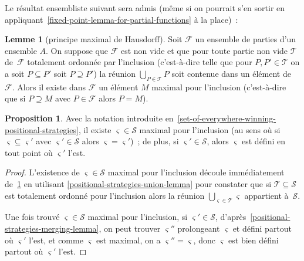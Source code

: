 \documentclass[12pt,a4paper]{article}
\theoremstyle{definition}
\newtheorem{prop}[comcnt]{Proposition}
\newtheorem{lem}[comcnt]{Lemme}
\begin{document}
Le résultat ensembliste suivant sera admis (même si on pourrait s'en
sortir en appliquant \ref{fixed-point-lemma-for-partial-functions} à
la place) :
\begin{lem}[principe maximal de Hausdorff]\label{hausdorff-maximal-principle}
Soit $\mathscr{F}$ un ensemble de parties d'un ensemble $A$.  On
suppose que $\mathscr{F}$ est non vide et que pour toute partie non
vide $\mathscr{T}$ de $\mathscr{F}$ totalement ordonnée par
l'inclusion (c'est-à-dire telle que pour $P,P' \in \mathscr{T}$ on a
soit $P \subseteq P'$ soit $P \supseteq P'$) la réunion $\bigcup_{P
  \in \mathscr{T}} P$ soit contenue dans un élément de $\mathscr{F}$.
Alors il existe dans $\mathscr{F}$ un élément $M$ maximal pour
l'inclusion (c'est-à-dire que si $P \supseteq M$ avec $P \in
\mathscr{F}$ alors $P=M$).
\end{lem}

\begin{prop}\label{existence-of-maximal-positional-strategy}
Avec la notation introduite
en \ref{set-of-everywhere-winning-positional-strategies}, il existe
$\varsigma \in \mathcal{S}$ maximal pour l'inclusion (au sens où si
$\varsigma \subseteq \varsigma'$ avec $\varsigma' \in \mathcal{S}$
alors $\varsigma = \varsigma'$) ; de plus, si $\varsigma' \in
\mathcal{S}$, alors $\varsigma$ est défini en tout point où
$\varsigma'$ l'est.
\end{prop}
\begin{proof}
L'existence de $\varsigma \in \mathcal{S}$ maximal pour l'inclusion
découle immédiatement de \ref{hausdorff-maximal-principle} en
utilisant \ref{positional-strategies-union-lemma} pour constater que
si $\mathscr{T} \subseteq \mathcal{S}$ est totalement ordonné pour
l'inclusion alors la réunion $\bigcup_{\varsigma\in\mathscr{T}}
\varsigma$ appartient à $\mathcal{S}$.

Une fois trouvé $\varsigma \in \mathcal{S}$ maximal pour l'inclusion,
si $\varsigma' \in \mathcal{S}$,
d'après \ref{positional-strategies-merging-lemma}, on peut trouver
$\varsigma''$ prolongeant $\varsigma$ et défini partout où
$\varsigma'$ l'est, et comme $\varsigma$ est maximal, on a
$\varsigma'' = \varsigma$, donc $\varsigma$ est bien défini partout où
$\varsigma'$ l'est.
\end{proof}
\end{document}
